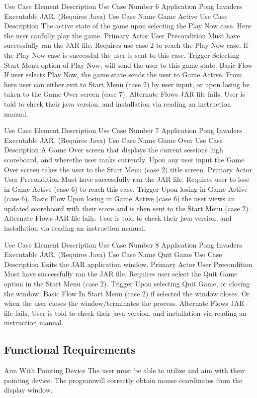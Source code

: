 \documentclass[12pt, titlepage]{article}
\begin{document}
Use Case Element
Description
Use Case Number
6
Application
Pong Invaders Executable JAR. (Requires Java)
Use Case Name
Game Active
Use Case Description
The active state of the game upon selecting the Play Now case. Here the user
canfully play the game.
Primary Actor
User 
Precondition
Must have successfully ran the JAR file. Requires use case 2 to reach the Play
Now case. If the Play Now case is successful the user is sent to this case.
Trigger
Selecting Start Menu option of Play Now, will send the user to this game state.
Basic Flow
If user selects Play Now, the game state sends the user to Game Active. From
here user can either exit to Start Menu (case 2) by user input, or upon losing
be taken to the Game Over screen (case 7).
Alternate Flows
JAR file fails. User is told to check their java version, and installation via
reading an instruction manual.



Use Case Element
Description
Use Case Number
7
Application
Pong Invaders Executable JAR. (Requires Java)
Use Case Name
Game Over
Use Case Description
A Game Over screen that displays the current sessions high scoreboard, and
wherethe user ranks currently. Upon any user input the Game Over screen takes
the
user to the Start Menu (case 2) title screen.
Primary Actor
User 
Precondition
Must have successfully ran the JAR file. Requires user to lose in Game Active
(case 6) to reach this case.
Trigger
Upon losing in Game Active (case 6).
Basic Flow
Upon losing in Game Active (case 6) the user views an updated scoreboard with
their score and is then sent to the Start Menu (case 2).
Alternate Flows
JAR file fails. User is told to check their java version, and installation via
reading an instruction manual.


Use Case Element
Description
Use Case Number
8
Application
Pong Invaders Executable JAR. (Requires Java)
Use Case Name
Quit Game
Use Case Description
Exits the JAR application window.
Primary Actor
User 
Precondition
Must have successfully ran the JAR file. Requires user select the Quit Game
option in the Start Menu (case 2).
Trigger
Upon selecting Quit Game, or closing the window.
Basic Flow
In Start Menu (case 2) if selected the window closes. Or when the user closes
the window/terminates the process.
Alternate Flows
JAR file fails. User is told to check their java version, and installation via
reading an instruction manual.

\subsection{Functional Requirements}
Aim With Pointing Device
The user must be able to utilize and aim with their pointing device. The
programwill correctly obtain mouse coordinates from the display window.
\end{document}
